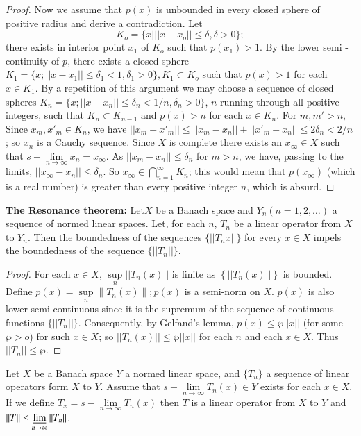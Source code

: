 \begin{proof}
 Now we assume that $p(x)$ is unbounded in every closed sphere of
 positive radius and derive a contradiction. Let 
 $$
 K_o = \{ x \big| ||x - x_o || \leq \delta, \delta > 0 \}; 
 $$
 there exists in interior point $x_1$ of $K_o$ such that $p(x_1) >
 1$. By the lower semi - continuity of $p$, there exists a closed
 sphere $K_1 = \bigg\{ x ; || x - x_1 || \leq \delta_1 < 1, \delta
_1 > 0\bigg\}, K_1 \subset K_o$ such that $p(x) > 1$ for each $x
 \in K_1$. By a repetition of this argument we may choose a sequence
 of closed spheres $K_n = \big\{ x ; || x - x_n || \leq \delta_n < 1/n,
 \delta_n > 0 \big\}$, $n$ running through all positive integers,
 such that ${K_n \subset K_{n-1}}$ and $p(x) > n$ for each $x \in
 K_n $. For $m, m' > n$, Since $x_m, x'_m \in K_n $, we have
 $|| x_m - x'_m || \leq || x_m - x_n|| + ||x'_m - x_n || \leq 2
 \delta_n < 2/n$; so
 $x_n$ is a Cauchy sequence. Since $X$ is complete there exists an
 $x_\infty \in X$ such that $s - \lim\limits_{ n \to \infty} x_n =
 x_\infty$. As $||x_m-x_n|| \leq\delta_n$ for $m>n$, we have,
 passing to the limits, $|| x_\infty- x_n || \leq \delta_n$. So $x_\infty \in
 \bigcap\limits^\infty_{ n = 1} K_n$; this would mean that
 $p(x_\infty)$ (which is a real number) is greater than every
 positive integer $n$, which is absurd. 
\end{proof}

\noindent \textbf{The Resonance theorem:} 
Let\pageoriginale $X$ be a Banach space and $Y_n (n = 1, 2, \ldots)$ a
sequence of 
normed linear spaces. Let, for each $n$, $T_n$ be a linear operator
from $X$ to $Y_n$. Then the boundedness of the sequences $\big\{|| T_n x
||\big\}$ for every $x \in X$ impels the boundedness of the sequence
$\big\{ || T_n ||\big\}$. 

\begin{proof}
 For each $x \in X$, $\sup\limits_n ||
 T_n (x)||$ is finite as $\left\{ || T_n (x) || \right\}$ is
 bounded. Define $p(x) =\sup\limits_n \| T_n (x)\| ; p(x)$ is a semi-norm on
 $X$. $p(x)$ is also lower semi-continuous since it is the supremum of
 the sequence of continuous functions $\big\{ || T_n
 ||\big\}$. Consequently, by Gelfand's lemma, $p(x) \leq \wp ||x||$
 (for some $\wp > o$) for such $x \in X $; so $ || T_n (x)||\leq \wp
 ||x||$ for each $n$ and each $x \in X$. Thus $ || T_n || \leq \wp $. 
\end{proof}

\begin{coro*}
 Let $X$ be a Banach space $Y$ a normed linear space, and $\big\{
 T_n \big\}$ a sequence of linear operators form $X$ to $Y$. Assume
 that $s - \lim\limits_{n \to \infty }T_n (x) \in Y $ exists for each
 $x \in X $. If we define $T_x = s- \lim\limits_{n \to \infty} T_n
 (x) $ then $T$ is a linear operator from $X $ to $Y$ and $||T|| \leq
 \varliminf\limits_{ n \to \infty} || T_n ||$. 
\end{coro*}


